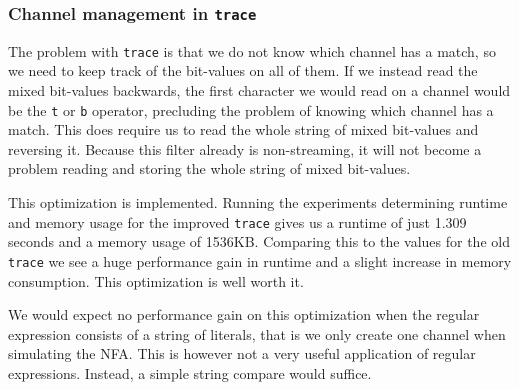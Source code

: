 \subsubsection{Channel management in \lstinline{trace}}

The problem with \lstinline{trace} is that we do not know which
channel has a match, so we need to keep track of the bit-values on all
of them. If we instead read the mixed bit-values backwards, the first
character we would read on a channel would be the \texttt{t} or
\texttt{b} operator, precluding the problem of knowing which channel
has a match. This does require us to read the whole string of mixed
bit-values and reversing it. Because this filter already is
non-streaming, it will not become a problem reading and storing the
whole string of mixed bit-values.

This optimization is implemented. Running the experiments determining
runtime and memory usage for the improved \texttt{trace} gives us a
runtime of just 1.309 seconds and a memory usage of 1536KB. Comparing
this to the values for the old \lstinline{trace} we see a huge
performance gain in runtime and a slight increase in memory
consumption. This optimization is well worth it.

We would expect no performance gain on this optimization when the
regular expression consists of a string of literals, that is we only
create one channel when simulating the NFA. This is however not a very
useful application of regular expressions. Instead, a simple string compare would suffice.
